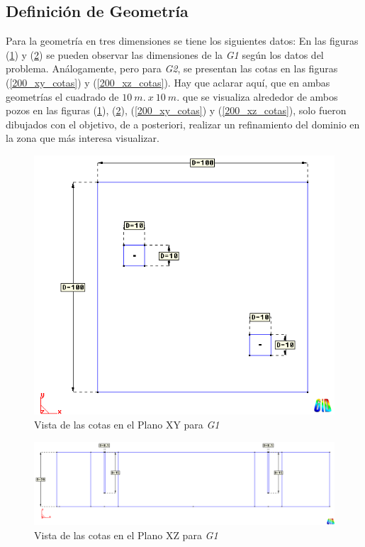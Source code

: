\documentclass[10pt,a4paper,final]{article}
\begin{document}
\subsection{Definición de Geometría}
Para la geometría en tres dimensiones se tiene los siguientes datos:
En las figuras (\ref{100_xy_cotas}) y (\ref{100_xz_cotas}) se pueden observar
las dimensiones de la \emph{G1} según los datos del problema. Análogamente, pero para \emph{G2}, se presentan las cotas en las figuras (\ref{200_xy_cotas}) y (\ref{200_xz_cotas}).
Hay que aclarar aquí, que en ambas geometrías el cuadrado de $10~m.~x~10~m.$ que se visualiza
alrededor de ambos pozos en las figuras (\ref{100_xy_cotas}), (\ref{100_xz_cotas}), (\ref{200_xy_cotas}) y (\ref{200_xz_cotas}), solo fueron dibujados con el
objetivo, de a posteriori, realizar un refinamiento del dominio en la zona que más interesa visualizar.\\
%
\begin{figure}[tbhp]
\centerline{\includegraphics[scale=0.5]{img/100m/100_xy_cotas}}
\caption{Vista de las cotas en el Plano XY para \emph{G1}}
\label{100_xy_cotas}
\end{figure}
%
\begin{figure}[tbhp]
\centerline{\includegraphics[scale=0.4]{img/100m/100_xz_cotas}}
\caption{Vista de las cotas en el Plano XZ para \emph{G1}}
\label{100_xz_cotas}
\end{figure}
\end{document}
